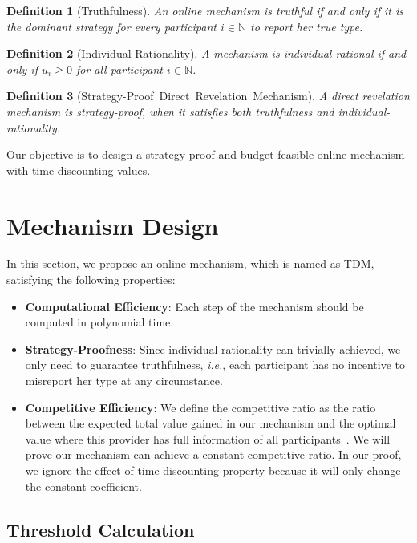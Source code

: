 \documentclass[conference,compsocconf,letterpaper,10pt]{IEEEtran}
\newtheorem{definition}{Definition}
\newcommand{\ie}{{\em i.e.}}
\begin{document}
\begin{definition}[Truthfulness]
An online mechanism is truthful if and only if it is the dominant strategy for every participant $i \in \mathbb{N}$ to report her true type.
\end{definition}

\begin{definition}[Individual-Rationality]
A mechanism is individual rational if and only if $u_i \ge 0$ for all participant $i \in \mathbb{N}$.
\end{definition}

\begin{definition}[Strategy-Proof\ Direct\ Revelation\ Mechanism]
A direct revelation mechanism is strategy-proof, when it satisfies both truthfulness and individual-rationality.
\end{definition}

Our objective is to design a strategy-proof and budget feasible online mechanism with time-discounting values.

\section{Mechanism Design}

In this section, we propose an online mechanism, which is named as TDM, satisfying the following properties:
\begin{itemize}
\item \textbf{Computational Efficiency}: Each step of the mechanism should be computed in polynomial time.

\item \textbf{Strategy-Proofness}: Since individual-rationality can trivially achieved, we only need to guarantee truthfulness, \ie, each participant has no incentive to misreport her type at any circumstance.

\item \textbf{Competitive Efficiency}: We define the competitive ratio as the ratio between the expected total value gained in our mechanism and the optimal value where this provider has full information of all participants~\cite{zhao2014crowdsource}. We will prove our mechanism can achieve a constant competitive ratio. In our proof, we ignore the effect of time-discounting property because it will only change the constant coefficient.
\end{itemize}

\subsection{Threshold Calculation}
\end{document}
